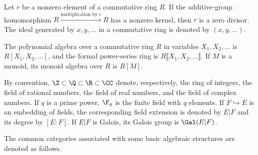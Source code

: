 Let $r$ be a nonzero element of a commutative ring $R$. If the additive-group homomorphism $R\xrightarrow{\text{multiplication by}\;r}R$ has a nonzero kernel, then $r$ is a zero divisor. The ideal generated by $x,y,\ldots$ in a commutative ring is denoted by $(x,y,\ldots)$.

The polynomial algebra over a commutative ring $R$ in variables $X_1,X_2,\ldots$ is $R[X_1,X_2,\ldots]$, and the formal power-series ring is $R\llbracket X_1,X_2,\ldots\rrbracket$. If $M$ is a monoid, its monoid algebra over $R$ is $R[M]$.

By convention, $\Z\subset\Q\subset\R\subset\CC$ denote, respectively, the ring of integers, the field of rational numbers, the field of real numbers, and the field of complex numbers. If $q$ is a prime power, $\F_q$ is the finite field with $q$ elements. If $F\hookrightarrow E$ is an embedding of fields, the corresponding field extension is denoted by $E|F$ and its degree by $[E:F]$. If $E|F$ is Galois, its Galois group is $\Gal(E|F)$.


The common categories associated with some basic algebraic structures are denoted as follows.

